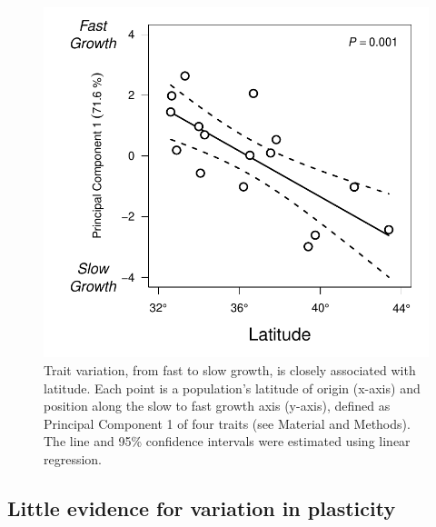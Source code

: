 \documentclass[11pt, oneside]{article}
\begin{document}

\begin{figure}[h!]
	\centerline{\includegraphics[width=1\textwidth]{Figures/Figure_PC1vLat.pdf}}
	\fontsize{10}{12}
	\selectfont
	\caption[Southern populations grow faster]{Trait variation, from fast to slow growth, is closely associated with latitude. Each point is a population's latitude of origin (x-axis) and position along the slow to fast growth axis (y-axis), defined as Principal Component 1 of four traits (see Material and Methods). The line and 95\% confidence intervals were estimated using linear regression.}
	\label{fig:Fig_PC1vLat}
\end{figure}

\subsection*{Little evidence for variation in plasticity}
\end{document}
